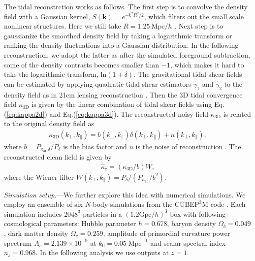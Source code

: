 \documentclass[aps,prl,twocolumn,showpacs,superscriptaddress,groupedaddress,nofootinbib]{revtex4}  %
\newcommand{\mr}{\mathrm}
\begin{document}
The tidal reconstrction works as follows. The first step is to convolve
the density field with a Gaussian kernel, $S(\bm{k})=e^{-k^2R^2/2}$, which
filters out the small scale nonlinear structures.
Here we still take $R=1.25\ \mr{Mpc}/h$ \cite{2012:pen}\cite{2015:zhu}.
Next step is to gaussianize the smoothed density field by taking a logarithmic
transform or ranking the density fluctuations into a Gaussian distribution.
In the following reconstruction, we adopt the latter as after the simulated
foreground subtraction, some of the density contrasts becomes smaller than $-1$,
which makes it hard to take the logarithmic transform, $\mathrm{ln}(1+\delta)$.
The gravitational tidal shear fields can be estimated by applying quadratic 
tidal shear estimators $\hat{\gamma}_1$ and $\hat{\gamma}_2$ to the density 
field as in 21cm lensing reconstruction \cite{2008:lu}. 
Then the 3D tidal convergence field $\kappa_\mr{3D}$ is given by the linear 
combination of tidal shear fields using Eq.(\ref{eq:kappa2d}) and 
Eq.(\ref{eq:kappa3d}).
The reconstructed noisy field $\kappa_\mr{3D}$ is related to the original 
density field as 
\begin{eqnarray}
\kappa_\mr{3D}(k_\perp,k_\parallel)=b(k_\perp,k_\parallel)
\delta(k_\perp,k_\parallel)+n(k_\perp,k_\parallel),
\end{eqnarray}
where $b=P_{\kappa_\mr{3D}\delta}/P_{\delta}$ is the bias factor and $n$ is 
the noise of reconstruction \cite{2015:zhu}. 
The reconstructed clean field is given by 
\begin{eqnarray}
\label{eq:kapc}
\hat{\kappa}_c=({\kappa_\mr{3D}}/{b})W,
\end{eqnarray}
where the Wiener filter $W(k_\perp,k_\parallel)=
P_\delta/(P_{\kappa_\mr{3d}}/b^2)$.

{\it Simulation setup.}---We further explore this idea with numerical 
simulations. We employ an ensemble of six $N$-body simulations from the
$\mr{CUBEP}^3\mr{M}$ code \cite{2013:code}. 
Each simulation includes $2048^3$ particles in a $(1.2\mr{Gpc}/h)^3$ box 
with following cosmological parameters: Hubble parameter $h=0.678$, baryon
density $\Omega_{b}=0.049$, dark matter density $\Omega_{c}=0.259$,
amplitude of primordial curvature power spectrum $A_s=2.139\times10^{-9}$ at 
$k_0=0.05\;\mr{Mpc}^{-1}$ and scalar spectral index $n_s=0.968$.
In the following analysis we use outputs at $z=1$.
\end{document}

